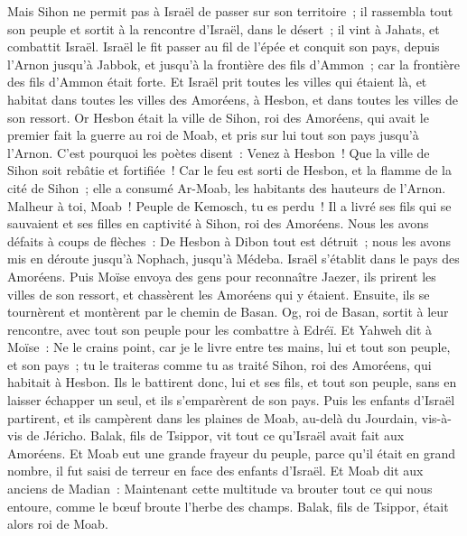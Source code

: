 \begin{multicols}{2}
Mais Sihon ne permit pas à Israël de passer sur son territoire~; il rassembla tout son peuple et sortit à la rencontre d'Israël, dans le désert~; il vint à Jahats, et combattit Israël.
Israël le fit passer au fil de l'épée et conquit son pays, depuis l'Arnon jusqu'à Jabbok, et jusqu'à la frontière des fils d'Ammon~; car la frontière des fils d'Ammon était forte.
Et Israël prit toutes les villes qui étaient là, et habitat dans toutes les villes des Amoréens, à Hesbon, et dans toutes les villes de son ressort.
Or Hesbon était la ville de Sihon, roi des Amoréens, qui avait le premier fait la guerre au roi de Moab, et pris sur lui tout son pays jusqu'à l'Arnon.
C'est pourquoi les poètes disent~: Venez à Hesbon~! Que la ville de Sihon soit rebâtie et fortifiée~!
Car le feu est sorti de Hesbon, et la flamme de la cité de Sihon~; elle a consumé Ar-Moab, les habitants des hauteurs de l'Arnon.
Malheur à toi, Moab~! Peuple de Kemosch, tu es perdu~! Il a livré ses fils qui se sauvaient et ses filles en captivité à Sihon, roi des Amoréens.
Nous les avons défaits à coups de flèches~: De Hesbon à Dibon tout est détruit~; nous les avons mis en déroute jusqu'à Nophach, jusqu'à Médeba.
Israël s'établit dans le pays des Amoréens.
Puis Moïse envoya des gens pour reconnaître Jaezer, ils prirent les villes de son ressort, et chassèrent les Amoréens qui y étaient.
Ensuite, ils se tournèrent et montèrent par le chemin de Basan. Og, roi de Basan, sortit à leur rencontre, avec tout son peuple pour les combattre à Edréï.
Et Yahweh dit à Moïse~: Ne le crains point, car je le livre entre tes mains, lui et tout son peuple, et son pays~; tu le traiteras comme tu as traité Sihon, roi des Amoréens, qui habitait à Hesbon.
Ils le battirent donc, lui et ses fils, et tout son peuple, sans en laisser échapper un seul, et ils s'emparèrent de son pays.
\VerseOne{}Puis les enfants d'Israël partirent, et ils campèrent dans les plaines de Moab, au-delà du Jourdain, vis-à-vis de Jéricho.
Balak, fils de Tsippor, vit tout ce qu'Israël avait fait aux Amoréens.
Et Moab eut une grande frayeur du peuple, parce qu'il était en grand nombre, il fut saisi de terreur en face des enfants d'Israël.
Et Moab dit aux anciens de Madian~: Maintenant cette multitude va brouter tout ce qui nous entoure, comme le bœuf broute l'herbe des champs. Balak, fils de Tsippor, était alors roi de Moab.

\end{multicols}
